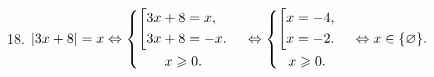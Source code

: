 18. $|3x+8|=x\Leftrightarrow \begin{cases}
  \begin{gathered}
    \left[
      \begin{gathered}
        3x+8=x, \hfill
        \\
        3x+8=-x. \hfill
        \\
      \end{gathered}
    \right. \hfill
    \\
    x\geqslant 0.    \\
  \end{gathered}
\end{cases}\Leftrightarrow \begin{cases}
  \begin{gathered}
    \left[
      \begin{gathered}
        x=-4, \hfill
        \\
        x=-2. \hfill
        \\
      \end{gathered}
    \right. \hfill
    \\
    x\geqslant 0.    \\
  \end{gathered}
\end{cases}
\Leftrightarrow x \in \{\varnothing\}.$\\
